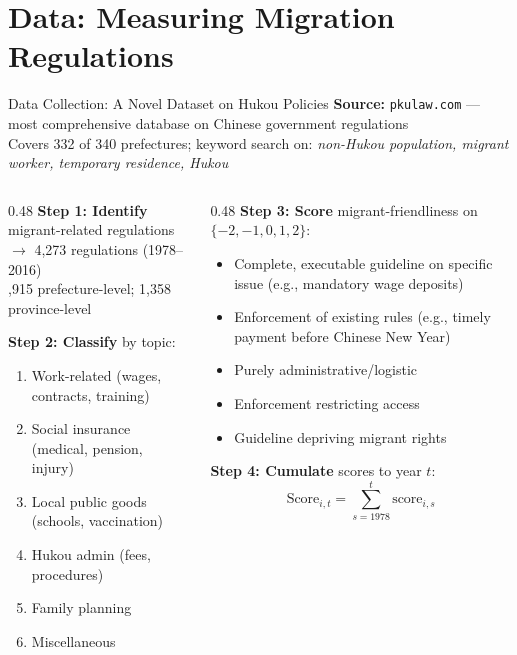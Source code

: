 \documentclass[10pt,aspectratio=169,t]{beamer}
\begin{document}
\section{Data: Measuring Migration Regulations}

\begin{frame}{Data Collection: A Novel Dataset on Hukou Policies}
\textbf{Source:} \texttt{pkulaw.com} --- most comprehensive database on Chinese government regulations\\[4pt]
Covers 332 of 340 prefectures; keyword search on: \textit{non-Hukou population, migrant worker, temporary residence, Hukou}

\bigskip
\begin{columns}[T]
\begin{column}{0.48\textwidth}
\textbf{Step 1: Identify} migrant-related regulations\\
$\rightarrow$ 4,273 regulations (1978--2016)\\[2pt]
,915 prefecture-level; 1,358 province-level

\bigskip
\textbf{Step 2: Classify} by topic:
\begin{enumerate}\setlength{\itemsep}{1pt}
    \item Work-related (wages, contracts, training)
    \item Social insurance (medical, pension, injury)
    \item Local public goods (schools, vaccination)
    \item Hukou admin (fees, procedures)
    \item Family planning
    \item Miscellaneous
\end{enumerate}
\end{column}
\begin{column}{0.48\textwidth}
\textbf{Step 3: Score} migrant-friendliness on $\{-2, -1, 0, 1, 2\}$:
\begin{itemize}\setlength{\itemsep}{2pt}
    \item[+2] Complete, executable guideline on specific issue (e.g., mandatory wage deposits)
    \item[+1] Enforcement of existing rules (e.g., timely payment before Chinese New Year)
    \item[0] Purely administrative/logistic
    \item[$-1$] Enforcement restricting access
    \item[$-2$] Guideline depriving migrant rights
\end{itemize}

\bigskip
\textbf{Step 4: Cumulate} scores to year $t$:
$$\text{Score}_{i,t} = \sum_{s=1978}^{t} \text{score}_{i,s}$$
\end{column}
\end{columns}
\end{frame}
\end{document}
